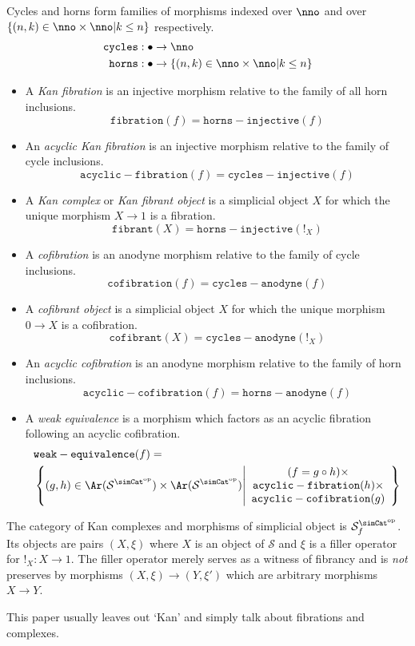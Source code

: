 \documentclass{tac}
\newcommand\cat\mathcal
\newcommand\set[1]{\left\{#1\right\}}
\newcommand\dual{^{\mathrm{op}}}
\newcommand\s{^{\simCat\dual}}
\newcommand\bang{!}
\newcommand\of{:}
\newcommand\f{_f}
\newcommand\code\mathtt
\begin{document}
\begin{definition} Cycles and horns form families of morphisms indexed over $\nno$ and over $\set{(n,k)\in\nno\times\nno| k\leq n }$ respectively.
\begin{align*} 
\code{cycles}&\of\bullet\to \nno\\
 \code{horns}&\of\bullet\to\set{(n,k)\in\nno\times\nno| k\leq n }
\end{align*}
\begin{itemize}
\item A \emph{Kan fibration} is an injective morphism relative to the family of all horn inclusions.
\[ \code{fibration}(f) = \code{horns-injective}(f) \]
\item An \emph{acyclic Kan fibration} is an injective morphism relative to the family of cycle inclusions.
\[ \code{acyclic-fibration}(f) = \code{cycles-injective}(f) \]
\item A \emph{Kan complex} or \emph{Kan fibrant object} is a simplicial object $X$ for which the unique morphism $X\to 1$ is a fibration.
\[ \code{fibrant}(X) = \code{horns-injective}(\bang_X) \]
\item A \emph{cofibration} is an anodyne morphism relative to the family of cycle inclusions.
\[ \code{cofibration}(f) = \code{cycles-anodyne}(f) \]
\item A \emph{cofibrant object} is a simplicial object $X$ for which the unique morphism $0\to X$ is a cofibration.
\[ \code{cofibrant}(X) = \code{cycles-anodyne}(\bang_X) \]
\item An \emph{acyclic cofibration} is an anodyne morphism relative to the family of horn inclusions.
\[ \code{acyclic-cofibration}(f) = \code{horns-anodyne}(f) \]
\item A \emph{weak equivalence} is a morphism which factors as an acyclic fibration following an acyclic cofibration.
\begin{align*} 
&\code{weak-equivalence}(f) =\\
&\set{(g,h)\in \Ar(\cat S\s)\times\Ar(\cat S\s) \middle| \begin{array}{c}
(f=g\circ h)\times\\
\code{acyclic-fibration}(h)\times\\
\code{acyclic-cofibration}(g)
\end{array}}
\end{align*}
\end{itemize}\label{Kan}

The category of Kan complexes and morphisms of simplicial object is $\cat S\s\f$. Its objects are pairs $(X,\xi)$ where $X$ is an object of $\cat S$ and $\xi$ is a filler operator for $\bang_X\of X\to 1$. The filler operator merely serves as a witness of fibrancy and is \emph{not} preserves by morphisms $(X,\xi)\to(Y,\xi')$ which are arbitrary morphisms $X\to Y$.
\end{definition}
This paper usually leaves out `Kan' and simply talk about fibrations and complexes. 
\end{document}
